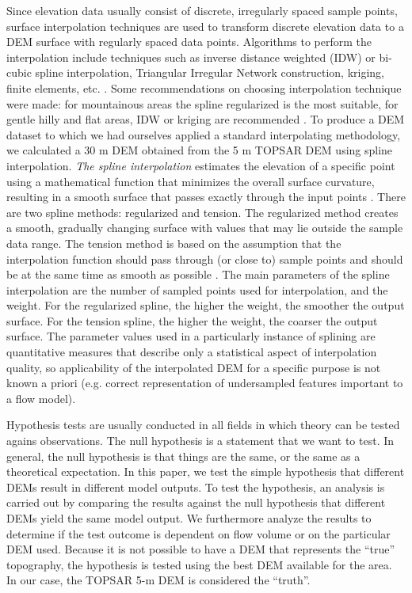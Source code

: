 \documentclass[12pt,letterpaper]{article}
\begin{document}
 Since elevation data usually consist of discrete, irregularly spaced sample points,
 surface interpolation techniques are used to transform discrete elevation
 data to a DEM surface with regularly spaced data points.  Algorithms to perform the interpolation include techniques such as
 inverse distance weighted (IDW) or bi-cubic spline interpolation, Triangular 
 Irregular Network construction, kriging, finite elements, etc. \citep{Florinsky1998, Cebecauer2002}. Some recommendations 
on choosing interpolation technique were made: for mountainous areas 
 the spline regularized is the most suitable, for gentle hilly and flat 
areas, IDW or kriging are recommended  \citep{Mitasova1993, Binh2008}.  To produce a DEM dataset to which we had ourselves applied a standard interpolating methodology, we calculated a 
30 m DEM obtained from the 5 m TOPSAR DEM using spline interpolation.
\textit{The spline interpolation} estimates the elevation of a specific point using a 
mathematical function that minimizes the overall surface curvature, resulting in a smooth 
surface that passes exactly through the input points \citep{Kamada2009, Xiao2010}.
There are two spline methods: regularized and tension. The regularized method creates a 
smooth, gradually changing surface with values that may lie outside the sample data range. The 
tension method is based on the assumption that the interpolation function should pass through (or
close to) sample points and should be at the same time as smooth as possible \citep{Mitasova1993, 
Kamada2009, Kvasov20011}.
The main parameters of the spline interpolation are the number of 
sampled points used for interpolation, and the 
weight. For the regularized spline, the higher 
the weight, the smoother the output surface. For 
the tension spline, the higher the weight, the 
coarser the output surface.  The parameter values used in a particularly instance of splining are quantitative measures that 
describe only a statistical aspect of interpolation quality, so applicability of
the interpolated DEM for a specific purpose is not known a priori (e.g. correct
representation of undersampled features important to a flow model).

 
Hypothesis tests are usually conducted in all fields in
which theory can be tested agains observations. The null 
hypothesis is a statement that we want to test. In general, the 
null hypothesis is that things are the same, or the same as a 
theoretical expectation.
In this paper, we test the simple hypothesis that different DEMs
result in different model outputs. To test the hypothesis, an
analysis is carried out by comparing the results against the null
hypothesis that different DEMs yield the same model output. 
We furthermore analyze the results to determine if the test outcome is
dependent on flow volume or on the particular DEM used. 
Because it is not possible to have a DEM that represents the ``true'' topography,
the hypothesis is tested using the best DEM available for the area. In
our case, the TOPSAR 5-m DEM is considered the ``truth''. 
\end{document}
